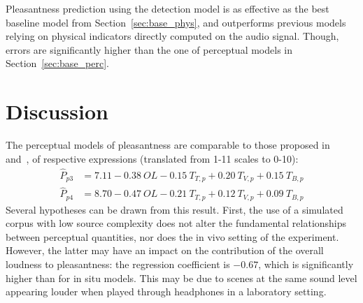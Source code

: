 \documentclass[11pt,a4paper]{article}
\begin{document}
Pleasantness prediction using the detection model is as effective as the best baseline model from Section~\ref{sec:base_phys}, and outperforms previous models relying on physical indicators directly computed on the audio signal. Though, errors are significantly higher than the one of perceptual models in Section~\ref{sec:base_perc}.\\

\section{Discussion}
\label{sec:discussion}

The perceptual models of pleasantness are comparable to those proposed in~\cite{ricciardi2014} and~\cite{aumond2017}, of respective expressions (translated from 1-11 scales to 0-10):
\begin{align}
\hat P_{p3} &= 7.11 - 0.38~OL - 0.15~T_{T, p} + 0.20~T_{V, p} + 0.15~T_{B, p}\\
\hat P_{p4} &= 8.70 - 0.47~OL - 0.21~T_{T, p} + 0.12~T_{V, p} + 0.09~T_{B, p}
\end{align}
Several hypotheses can be drawn from this result. First, the use of a simulated corpus with low source complexity does not alter the fundamental relationships between perceptual quantities, nor does the in vivo setting of the experiment. However, the latter may have an impact on the contribution of the overall loudness to pleasantness: the regression coefficient is $-0.67$, which is significantly higher than for in situ models. This may be due to scenes at the same sound level appearing louder when played through headphones in a laboratory setting.\\
\end{document}
